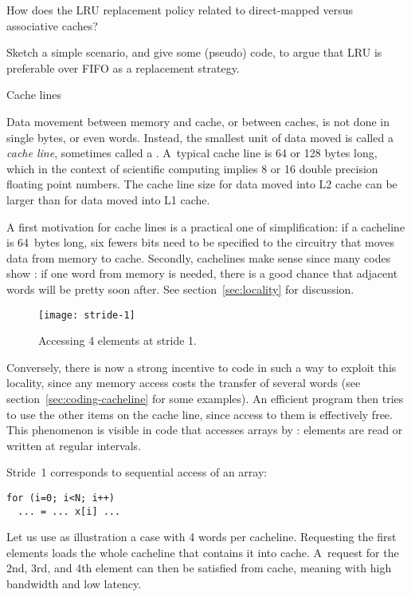 \begin{exercise}
  How does the LRU replacement policy related to direct-mapped versus
  associative caches?
\end{exercise}

\begin{exercise}
  Sketch a simple scenario, and give some (pseudo) code, to argue that
  LRU is preferable over FIFO as a replacement strategy.
\end{exercise}


 {Cache lines}
\label{sec:cacheline}\label{sec:stride}

Data movement between memory and cache, or between caches, is not done
in single bytes, or even words. Instead, the smallest unit of data
moved is called a \emph{cache line}, sometimes called a
.  A~typical cache line is 64 or 128 bytes
long, which in the context of scientific computing implies 8 or 16
double precision floating point numbers. The cache line size for data
moved into L2 cache can be larger than for data moved into L1 cache.

A first motivation for cache lines is a practical one
of simplification:
if a cacheline is 64~bytes long, six fewers bits
need to be specified to the circuitry that moves data from memory
to cache.
Secondly, cachelines make sense since many
codes show :
if one word from memory is needed, there is a good chance that
adjacent words will be pretty soon after.
See section~\ref{sec:locality} for discussion.

\begin{wrapfigure}{r}{3in}
  \texttt{[image: stride-1]}
  \caption{Accessing 4 elements at stride 1.}
  \label{fig:stride-1}
\end{wrapfigure}
%
Conversely, there is now a strong incentive to code in such a way to
exploit this locality,
since any memory access costs the transfer of several words (see
section~\ref{sec:coding-cacheline} for some examples). An
efficient program then tries to use the other items on the cache line,
since access to them is effectively free. This phenomenon is visible in
code that accesses arrays by : elements are read or
written at regular intervals.

Stride~1 corresponds to sequential access of an array:
\begin{verbatim}
for (i=0; i<N; i++)
  ... = ... x[i] ...
\end{verbatim}
Let us use as illustration a case with 4 words per cacheline. Requesting
the first elements loads the whole cacheline that contains it into
cache. A~request for the 2nd, 3rd, and 4th element can then be
satisfied from cache, meaning with high bandwidth and low latency.
\bigskip

